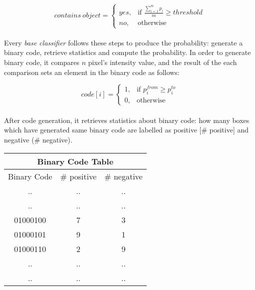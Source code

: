 \documentclass{report}
\begin{document}
            \[
                contains\ object =
                \begin{cases}
                    yes, & \text{if } \frac {\sum\limits_{i=1}^m {p_{i}}} {m} \geq threshold \\
                    no , & \text{otherwise}
                \end{cases}
            \]

        \paragraph{}
            Every \textit{base classifier} follows these steps to produce the probability: generate a binary code, retrieve statistics
            and compute the probability. In order to generate binary code, it compares $n$ pixel's intensity value, and the result of the
            each comparison sets an element in the binary code as follows:

            \[
                code[i] =
                \begin{cases}
                    1, & \text{if } p^{from}_{i} \geq p^{to}_{i} \\
                    0 , & \text{otherwise}
                \end{cases}
            \]

        \paragraph{}
            After code generation, it retrieves statistics about binary code: how many boxes which have generated
            same binary code are labelled as positive [\# positive] and negative (\# negative).
            \begin{center}
                \begin{tabular}{ | c | c | c | }

                      \hline
                      \multicolumn{3}{|c|}{ Binary Code Table} \\
                      \hline
                      Binary Code & \# positive & \# negative \\
                      \hline
                      .. & .. & .. \\
                      .. & .. & .. \\
                      01000100 & 7 & 3 \\
                      01000101 & 9 & 1 \\
                      01000110 & 2 & 9 \\
                      .. & .. & .. \\
                      .. & .. & .. \\
                      \hline
                \end{tabular}
            \end{center}
\end{document}
